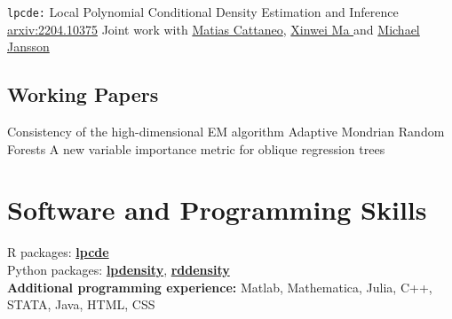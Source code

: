 \documentclass[10pt,a4paper,roman]{moderncv}        %
\begin{document}
\cventry{}
{\vspace{-0.4cm}}
{\texttt{lpcde:} Local Polynomial Conditional Density Estimation and Inference}
{\color{blue}\href{https://arxiv.org/abs/2204.10375}{arxiv:2204.10375}\color{black}}{}
{Joint work with \color{blue}\href{https://cattaneo.princeton.edu}{Matias Cattaneo}\color{black},
  \color{blue}\href{https://sites.google.com/view/xinweima/home?authuser=0}{Xinwei
    Ma }\color{black}
  and
  \color{blue}\href{https://sites.google.com/berkeley.edu/michael-jansson/}{Michael
    Jansson}\color{black}
  }
\subsection{Working Papers}
{Consistency of the high-dimensional EM algorithm} {}{}{}
{Adaptive Mondrian Random Forests} {}{}{}
{A new variable importance metric for oblique regression trees} {}{}{}

\vspace{-0.3cm}
\section{Software and Programming Skills}
R packages:
\color{blue}\href{https://nppackages.github.io/lpcde/}{\textbf{lpcde}}\color{black}
\\
Python packages: \color{blue}\href{https://nppackages.github.io/lpdensity_doc/}
{\textbf{lpdensity}}\color{black},
\color{blue}\href{https://rdpackages.github.io/rddensity_doc/}
{\textbf{rddensity}}\color{black}
\\
\textbf{Additional programming experience:}
Matlab, Mathematica, Julia, C++, STATA, Java, HTML, CSS
\end{document}

